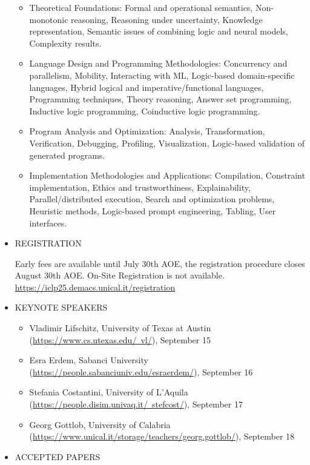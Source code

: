 \documentclass[prodmode,acmtecs]{acmsmall} %
\begin{document}
\begin{itemize}
\begin{itemize}\item  Theoretical Foundations: Formal and operational semantics, Non-monotonic reasoning, Reasoning under uncertainty, Knowledge representation, Semantic issues of combining logic and neural models, Complexity results.
\item  Language Design and Programming Methodologies: Concurrency and parallelism, Mobility, Interacting with ML, Logic-based domain-specific languages, Hybrid logical and imperative/functional languages, Programming techniques, Theory reasoning, Answer set programming, Inductive logic programming, Coinductive logic programming.
\item  Program Analysis and Optimization: Analysis, Transformation, Verification, Debugging, Profiling, Visualization, Logic-based validation of generated programs.
\item  Implementation Methodologies and Applications: Compilation, Constraint implementation, Ethics and trustworthiness, Explainability, Parallel/distributed execution, Search and optimization problems, Heuristic methods, Logic-based prompt engineering, Tabling, User interfaces.
\end{itemize} 
\item  REGISTRATION 
 
  Early fees are available until July 30th AOE, the registration procedure closes August 30th AOE. On-Site Registration is not available. \href{https://iclp25.demacs.unical.it/registration}{https://iclp25.demacs.unical.it/registration} 
 
\item  KEYNOTE SPEAKERS 
 
\begin{itemize}\item  Vladimir Lifschitz, University of Texas at Austin (\href{https://www.cs.utexas.edu/~vl/}{https://www.cs.utexas.edu/~vl/}), September 15
\item  Esra Erdem, Sabanci University (\href{https://people.sabanciuniv.edu/esraerdem/}{https://people.sabanciuniv.edu/esraerdem/}), September 16
\item  Stefania Costantini, University of L’Aquila (\href{https://people.disim.univaq.it/~stefcost/}{https://people.disim.univaq.it/~stefcost/}), September 17
\item  Georg Gottlob, University of Calabria (\href{https://www.unical.it/storage/teachers/georg.gottlob/}{https://www.unical.it/storage/teachers/georg.gottlob/}), September 18
\end{itemize} 
\item  ACCEPTED PAPERS 
 

\end{itemize}
\end{document}
